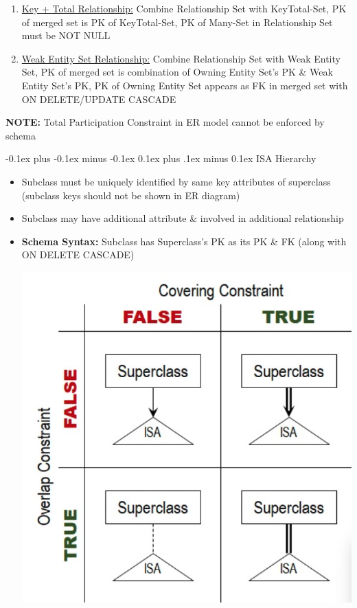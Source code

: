 \documentclass[landscape]{article}
\makeatletter
\renewcommand{\subsection}{\@startsection{subsection}{2}{0mm}%
  {-0.1ex plus -0.1ex minus -0.1ex}%
  {0.1ex plus .1ex minus 0.1ex}%
{\normalfont\scriptsize\bfseries}}
\makeatother
\begin{document}
\begin{multicols*}{5}
\begin{enumerate}
\begin{itemize}
      \end{itemize}
      \item \underline{Key + Total Relationship:} Combine Relationship Set with KeyTotal-Set, PK of merged set is PK of KeyTotal-Set, PK of Many-Set in Relationship Set must be NOT NULL
      \item \underline{Weak Entity Set Relationship:} Combine Relationship Set with Weak Entity Set, PK of merged set is combination of Owning Entity Set's PK \& Weak Entity Set's PK, PK of Owning Entity Set appears as FK in merged set with ON DELETE/UPDATE CASCADE 
    \end{enumerate}
    \textbf{NOTE:} Total Participation Constraint in ER model cannot be enforced by schema

    \subsection{ISA Hierarchy}
    \begin{itemize}
      \item Subclass must be uniquely identified by same key attributes of superclass (subclass keys should not be shown in ER diagram)
      \item Subclass may have additional attribute \& involved in additional relationship
      \item \textbf{Schema Syntax:} Subclass has Superclass's PK as its PK \& FK (along with ON DELETE CASCADE)
      \begin{multicols}{2}
        \noindent
        \includegraphics[width=0.9\linewidth]{9_ISA.png}

\end{multicols}
\end{itemize}
\end{multicols*}
\end{document}
